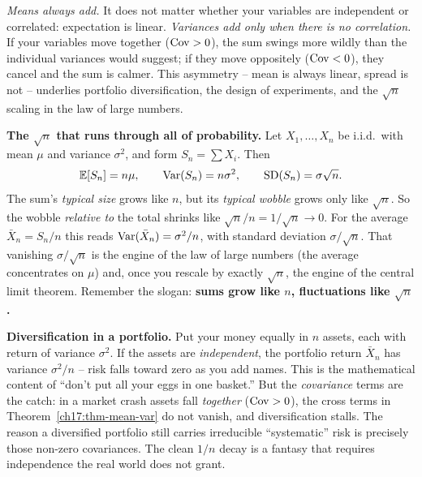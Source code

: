 \begin{happeningbox}
\emph{Means always add.} It does not matter whether your variables are
independent or correlated: expectation is linear. \emph{Variances add only
when there is no correlation.} If your
variables move together ($\operatorname{Cov}>0$), the sum swings more wildly than the
individual variances would suggest; if they move oppositely ($\operatorname{Cov}<0$),
they cancel and the sum is calmer. This asymmetry -- mean is always
linear, spread is not -- underlies portfolio diversification, the design
of experiments, and the $\sqrt{n}$ scaling in the law of large numbers.
\end{happeningbox}

\begin{focusbox}
\textbf{The $\sqrt{n}$ that runs through all of probability.}
Let $X_1,\dots,X_n$ be i.i.d.\ with mean $\mu$ and variance $\sigma^2$,
and form $S_n=\sum X_i$. Then
\[
\operatorname{\mathbb{E}}[S_n]=n\mu, \qquad \operatorname{Var}(S_n)=n\sigma^2, \qquad \operatorname{SD}(S_n)=\sigma\sqrt{n}.
\]
The sum's \emph{typical size} grows like $n$, but its \emph{typical
wobble} grows only like $\sqrt n$. So the wobble \emph{relative to} the
total shrinks like $\sqrt n / n = 1/\sqrt n \to 0$. For the average
$\bar X_n=S_n/n$ this reads $\operatorname{Var}(\bar X_n)=\sigma^2/n$, with standard
deviation $\sigma/\sqrt n$. That vanishing $\sigma/\sqrt n$ is the engine
of the law of large numbers (the average concentrates on $\mu$) and, once
you rescale by exactly $\sqrt n$, the engine of the central limit theorem.
Remember the slogan: \textbf{sums grow like $n$, fluctuations like
$\sqrt n$.}
\end{focusbox}

\begin{applicationbox}
\textbf{Diversification in a portfolio.} Put your money equally in $n$
assets, each with return of variance $\sigma^2$. If the assets are
\emph{independent}, the portfolio return $\bar X_n$ has variance
$\sigma^2/n$ -- risk falls toward zero as you add names. This is the
mathematical content of ``don't put all your eggs in one basket.'' But the
\emph{covariance} terms are the catch: in a market crash assets fall
\emph{together} ($\operatorname{Cov}>0$), the cross terms in
Theorem~\ref{ch17:thm-mean-var} do not vanish, and diversification stalls.
The reason a diversified portfolio still carries irreducible
``systematic'' risk is precisely those non-zero covariances. The clean
$1/n$ decay is a fantasy that requires independence the real world does
not grant.
\end{applicationbox}

